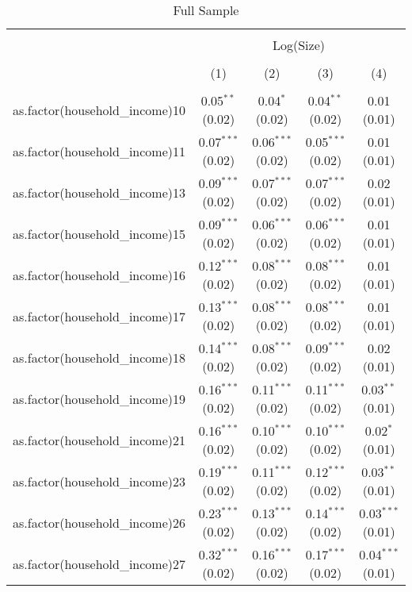 
\begin{table}[!htbp] \centering 
  \caption{Full Sample} 
  \label{tab:packageSizeFullappendix} 
\begin{tabular}{@{\extracolsep{5pt}}lcccc} 
\\[-1.8ex]\hline 
\hline \\[-1.8ex] 
 & \multicolumn{4}{c}{Log(Size)} \\ 
\\[-1.8ex] & (1) & (2) & (3) & (4)\\ 
\hline \\[-1.8ex] 
 as.factor(household\_income)10 & 0.05$^{**}$ (0.02) & 0.04$^{*}$ (0.02) & 0.04$^{**}$ (0.02) & 0.01 (0.01) \\ 
  as.factor(household\_income)11 & 0.07$^{***}$ (0.02) & 0.06$^{***}$ (0.02) & 0.05$^{***}$ (0.02) & 0.01 (0.01) \\ 
  as.factor(household\_income)13 & 0.09$^{***}$ (0.02) & 0.07$^{***}$ (0.02) & 0.07$^{***}$ (0.02) & 0.02 (0.01) \\ 
  as.factor(household\_income)15 & 0.09$^{***}$ (0.02) & 0.06$^{***}$ (0.02) & 0.06$^{***}$ (0.02) & 0.01 (0.01) \\ 
  as.factor(household\_income)16 & 0.12$^{***}$ (0.02) & 0.08$^{***}$ (0.02) & 0.08$^{***}$ (0.02) & 0.01 (0.01) \\ 
  as.factor(household\_income)17 & 0.13$^{***}$ (0.02) & 0.08$^{***}$ (0.02) & 0.08$^{***}$ (0.02) & 0.01 (0.01) \\ 
  as.factor(household\_income)18 & 0.14$^{***}$ (0.02) & 0.08$^{***}$ (0.02) & 0.09$^{***}$ (0.02) & 0.02 (0.01) \\ 
  as.factor(household\_income)19 & 0.16$^{***}$ (0.02) & 0.11$^{***}$ (0.02) & 0.11$^{***}$ (0.02) & 0.03$^{**}$ (0.01) \\ 
  as.factor(household\_income)21 & 0.16$^{***}$ (0.02) & 0.10$^{***}$ (0.02) & 0.10$^{***}$ (0.02) & 0.02$^{*}$ (0.01) \\ 
  as.factor(household\_income)23 & 0.19$^{***}$ (0.02) & 0.11$^{***}$ (0.02) & 0.12$^{***}$ (0.02) & 0.03$^{**}$ (0.01) \\ 
  as.factor(household\_income)26 & 0.23$^{***}$ (0.02) & 0.13$^{***}$ (0.02) & 0.14$^{***}$ (0.02) & 0.03$^{***}$ (0.01) \\ 
  as.factor(household\_income)27 & 0.32$^{***}$ (0.02) & 0.16$^{***}$ (0.02) & 0.17$^{***}$ (0.02) & 0.04$^{***}$ (0.01) \\ 

\end{tabular}
\end{table}
